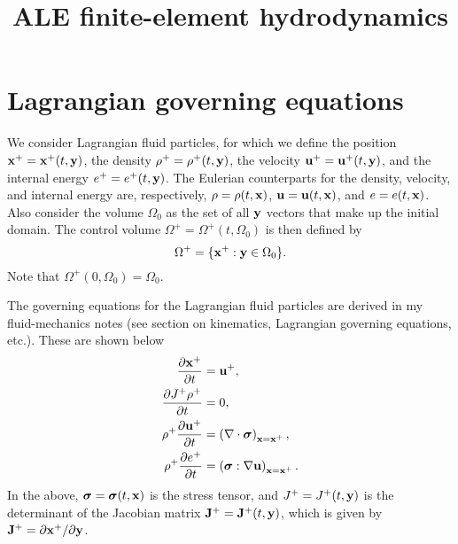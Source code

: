 \documentclass[11pt]{article}
\title{ALE finite-element hydrodynamics}
\begin{document}
\maketitle

\section{Lagrangian governing equations}
We consider Lagrangian fluid particles, for which we define the position $\mathbf{x}^+=\mathbf{x}^+(t,\mathbf{y})$, the density $\rho^+ = \rho^+(t,\mathbf{y})$, the velocity $\mathbf{u}^+ = \mathbf{u}^+(t,\mathbf{y})$, and the internal energy $e^+ = e^+(t,\mathbf{y})$. The Eulerian counterparts for the density, velocity, and internal energy are, respectively, $\rho = \rho(t,\mathbf{x})$, $\mathbf{u} = \mathbf{u}(t,\mathbf{x})$, and $e = e(t,\mathbf{x})$. Also consider the volume $\Omega_0$ as the set of all $\mathbf{y}$ vectors that make up the initial domain. The control volume $\Omega^+ = \Omega^+(t, \Omega_0)$ is then defined by
\begin{equation}
    \Omega^+ = \{ \mathbf{x}^+:\mathbf{y} \in \Omega_0 \}.
\end{equation}
Note that $\Omega^+(0,\Omega_0) = \Omega_0$.

The governing equations for the Lagrangian fluid particles are derived in my fluid-mechanics notes (see section on kinematics, Lagrangian governing equations, etc.). These are shown below
\begin{align}
    \frac{\partial \mathbf{x}^+}{\partial t} &= \mathbf{u}^+, \label{eq:lag_gov_evol_x} \\
    \frac{\partial J^+ \rho^+}{\partial t} &= 0, \label{eq:lag_gov_evol_rho} \\
    \rho^+ \frac{\partial \mathbf{u}^+}{\partial t} &= \left ( \nabla \cdot \bm \sigma \right )_{\mathbf{x} = \mathbf{x}^+}, \label{eq:lag_gov_evol_u} \\
    \rho^+ \frac{\partial e^+}{\partial t} &= \left ( \bm \sigma : \nabla \mathbf{u} \right )_{\mathbf{x} = \mathbf{x}^+}. \label{eq:lag_gov_evol_e}
\end{align}
In the above, $\bm \sigma = \bm \sigma(t,\mathbf{x})$ is the stress tensor, and $J^+ = J^+(t,\mathbf{y})$ is the determinant of the Jacobian matrix $\mathbf{J}^+ = \mathbf{J}^+(t,\mathbf{y})$, which is given by $\mathbf{J}^+ =  \partial \mathbf{x}^+ / \partial \mathbf{y}$. 
\end{document}
